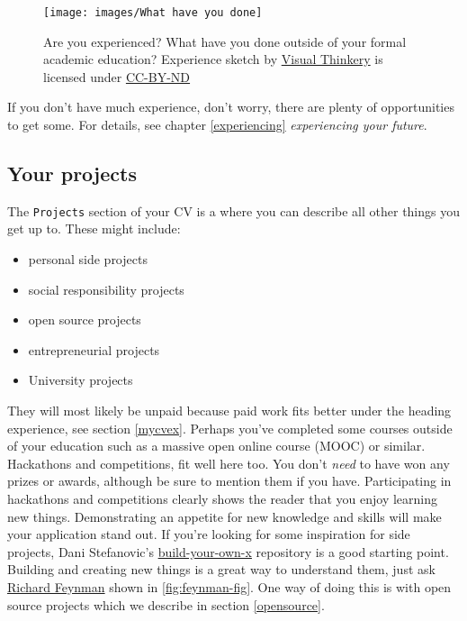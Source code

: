 \documentclass[
]{book}
\providecommand{\tightlist}{%
  \setlength{\itemsep}{0pt}\setlength{\parskip}{0pt}}
\begin{document}
\begin{figure}

{\centering \texttt{[image: images/What have you done]} 

}

\caption{Are you experienced? What have you done outside of your formal academic education? Experience sketch by \href{https://visualthinkery.com/}{Visual Thinkery} is licensed under \href{https://creativecommons.org/licenses/by-nd/4.0/}{CC-BY-ND}}\label{fig:done-fig}
\end{figure}



If you don't have much experience, don't worry, there are plenty of opportunities to get some. For details, see chapter \ref{experiencing} \emph{experiencing your future}.

\hypertarget{mycvpj}{%
\subsection{Your projects}\label{mycvpj}}

The \texttt{Projects} section of your CV is a where you can describe all other things you get up to. These might include:

\begin{itemize}
\tightlist
\item
  personal side projects
\item
  social responsibility projects
\item
  open source projects
\item
  entrepreneurial projects
\item
  University projects
\end{itemize}

They will most likely be unpaid because paid work fits better under the heading experience, see section \ref{mycvex}. Perhaps you've completed some courses outside of your education such as a massive open online course (MOOC) or similar. Hackathons and competitions, fit well here too. \citep{hafb} You don't \emph{need} to have won any prizes or awards, although be sure to mention them if you have. Participating in hackathons and competitions clearly shows the reader that you enjoy learning new things. Demonstrating an appetite for new knowledge and skills will make your application stand out. If you're looking for some inspiration for side projects, Dani Stefanovic's \href{https://github.com/danistefanovic/build-your-own-x}{build-your-own-x} repository is a good starting point. Building and creating new things is a great way to understand them, just ask \href{https://en.wikipedia.org/wiki/Richard_Feynman}{Richard Feynman} shown in \ref{fig:feynman-fig}. One way of doing this is with open source projects which we describe in section \ref{opensource}.
\end{document}
